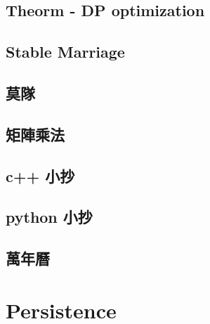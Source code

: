 \subsection{Theorm - DP optimization}

\subsection{Stable Marriage}

\subsection{莫隊}

\subsection{矩陣乘法}

\subsection{c++ 小抄}

\subsection{python 小抄}

\subsection{萬年曆}


\section{Persistence}

